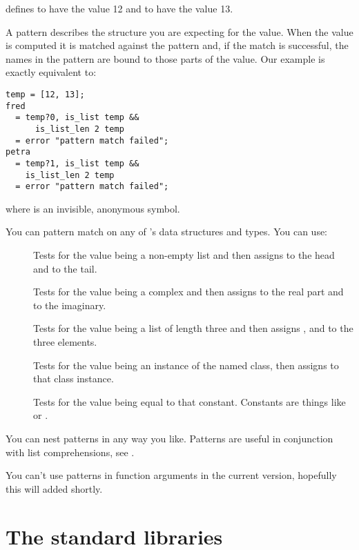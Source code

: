 \noindent
defines  to have the value 12 and  to have the value 13.

A pattern describes the structure you are expecting for the value. When the
value is computed it is matched against the pattern and, if the match is
successful, the names in the pattern are bound to those parts of the value.
Our example is exactly equivalent to:

\begin{verbatim}
temp = [12, 13];
fred 
  = temp?0, is_list temp && 
      is_list_len 2 temp
  = error "pattern match failed";
petra 
  = temp?1, is_list temp && 
    is_list_len 2 temp
  = error "pattern match failed";
\end{verbatim}

\noindent
where  is an invisible, anonymous symbol.

You can pattern match on any of \nip{}'s data structures and types. You can
use:

\begin{description}

\item[]
Tests for the value being a non-empty list and then assigns  to the
head and  to the tail.

\item[]
Tests for the value being a complex and then assigns  to the
real part and  to the imaginary.

\item[\ct{[a,b,c]}]
Tests for the value being a list of length three and then assigns ,
 and  to the three elements.

\item[]
Tests for the value being an instance of the named class, then assigns 
 to that class instance.

\item[]
Tests for the value being equal to that constant. Constants are things like
 or .

\end{description}

You can nest patterns in any way you like. Patterns are useful in conjunction
with list comprehensions, see .

You can't use patterns in function arguments in the current version, hopefully
this will added shortly.

\section{The standard libraries}

